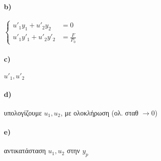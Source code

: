 \documentclass[11pt,a4paper,titlepage,final]{article}
\begin{document}
\paragraph{\textlatin{b})}
\(
\begin{cases}
u'_1y_1+u'_2y_2 &=0\\
u'_1y'_1+u'_2y'_2 &= \frac{F}{P_0}
\end{cases}
\)

\paragraph{\textlatin{c)}}
\(
u'_1,u'_2
\)

\paragraph{\textlatin{d)}}
υπολογίζουμε \(u_1,u_2\), με ολοκλήρωση (ολ. σταθ \(\rightarrow 0\))

\paragraph{\textlatin{e)}}
αντικατάσταση \(u_1,u_2\) στην \(y_p\)
\end{document}
